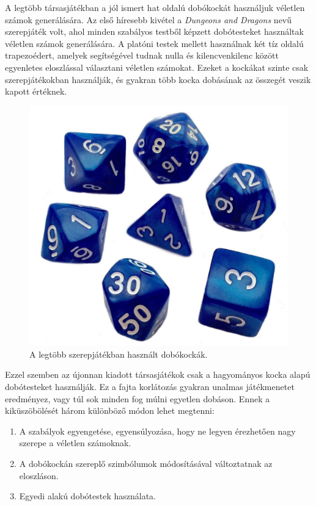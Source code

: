 
A legtöbb társasjátékban a jól ismert hat oldalú dobókockát használjuk véletlen számok generálására.
Az első híresebb kivétel a \textit{Dungeons and Dragons}\cite{dnd} nevű szerepjáték volt, ahol minden szabályos testből képzett dobótesteket használtak véletlen számok generálására.
A platóni testek mellett használnak két tíz oldalú trapezoédert, amelyek segítségével tudnak nulla és kilencvenkilenc között egyenletes eloszlással választani véletlen számokat.
Ezeket a kockákat szinte csak szerepjátékokban használják, és gyakran több kocka dobásának az összegét veszik kapott értéknek.

\begin{figure}[h!]
	\centering
	\includegraphics[scale=0.15]{images/diceset.png}
	\caption{A legtöbb szerepjátékban használt dobókockák.}
	\label{fig:diceset}
\end{figure}

Ezzel szemben az újonnan kiadott társasjátékok csak a hagyományos kocka alapú dobótesteket használják.
Ez a fajta korlátozás gyakran unalmas játékmenetet eredményez, vagy túl sok minden fog múlni egyetlen dobáson.
Ennek a kiküszöbölését három különböző módon lehet megtenni:
\begin{enumerate}
\item A szabályok egyengetése, egyensúlyozása, hogy ne legyen érezhetően nagy szerepe a véletlen számoknak.
\item A dobókockán szereplő szimbólumok módosításával változtatnak az eloszláson.
\item Egyedi alakú dobótestek használata.
\end{enumerate}

